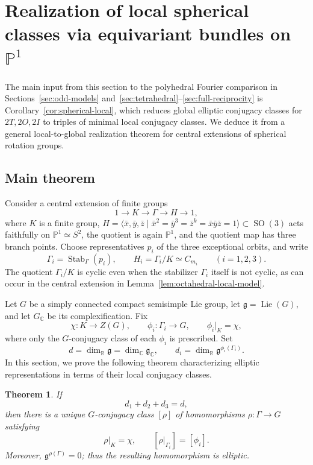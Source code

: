 \documentclass[11pt,a4paper,reqno]{amsart}
\theoremstyle{plain}
\newtheorem{theorem}{Theorem}[section]
\theoremstyle{definition}
\theoremstyle{remark}
\numberwithin{equation}{section}
\DeclareMathOperator{\Lie}{Lie}
\DeclareMathOperator{\Stab}{Stab}
\DeclareMathOperator{\SO}{SO}
\newcommand{\CC}{\mathbb C}
\newcommand{\RR}{\mathbb R}
\newcommand{\PP}{\mathbb P}
\newcommand{\fg}{\mathfrak g}
\begin{document}
\section{Realization of local spherical classes via equivariant bundles on \texorpdfstring{$\PP^1$}{P1}}\label{sec:realization}

The main input from this section to the polyhedral Fourier comparison in Sections~\ref{sec:odd-models} and~\ref{sec:tetrahedral}--\ref{sec:full-reciprocity} is Corollary~\ref{cor:spherical-local}, which reduces global elliptic conjugacy classes for $2T,2O,2I$ to triples of minimal local conjugacy classes. We deduce it from a general local-to-global realization theorem for central extensions of spherical rotation groups.

\subsection{Main theorem}

Consider a central extension of finite groups
\[
1 \longrightarrow K \longrightarrow \Gamma
\longrightarrow H \longrightarrow 1,
\]
where $K$ is a finite group, $H=\langle \bar x,\bar y,\bar z\mid \bar x^2=\bar y^3=\bar z^k=\bar x\bar y\bar z=1\rangle \subset \SO(3)$ acts faithfully on
$\PP^1 \simeq S^2$, the quotient is again $\PP^1$,
and the quotient map has three branch points.
Choose representatives $p_i$ of the three exceptional orbits, and write
\[
\Gamma_i = \Stab_{\Gamma}(p_i),
\qquad
H_i = \Gamma_i/K \simeq C_{m_i}
\qquad (i=1,2,3).
\]
The quotient $\Gamma_i/K$ is cyclic even when the stabilizer $\Gamma_i$ itself is not cyclic, as can occur in the central extension in Lemma~\ref{lem:octahedral-local-model}.

Let $G$ be a simply connected compact semisimple Lie group,
let $\fg=\Lie(G)$, and let $G_{\CC}$
be its complexification. Fix
\[
\chi \colon K \longrightarrow Z(G),
\qquad
\phi_i \colon \Gamma_i \longrightarrow G,
\qquad
\phi_i|_K = \chi,
\]
where only the $G$-conjugacy class of each $\phi_i$ is prescribed.
Set
\[
d = \dim_{\RR}\fg
  = \dim_{\CC}\fg_{\CC},
\qquad
d_i = \dim_{\RR}
      \fg^{\phi_i(\Gamma_i)}.
\]
In this section, we prove the following theorem characterizing elliptic representations in terms of their local conjugacy classes.

\begin{theorem}\label{thm:local-realization}
If
\[
d_1+d_2+d_3=d,
\]
then there is a unique $G$-conjugacy class $[\rho]$ of homomorphisms
$\rho \colon \Gamma \to G$ satisfying
\[
\rho|_K = \chi,
\qquad
[\rho|_{\Gamma_i}] = [\phi_i].
\]
Moreover, $\fg^{\rho(\Gamma)}=0$; thus the resulting
homomorphism is elliptic.
\end{theorem}
\end{document}
